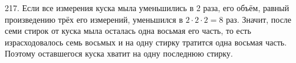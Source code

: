 217. Если все измерения куска мыла уменьшились в 2 раза, его объём, равный произведению трёх его измерений, уменьшился в $2\cdot2\cdot2=8$ раз. Значит, после семи стирок от куска мыла осталась одна восьмая его часть, то есть израсходовалось семь восьмых и на одну стирку тратится одна восьмая часть. Поэтому оставшегося куска хватит на одну последнюю стирку.\\
